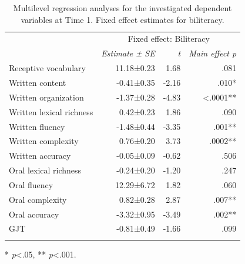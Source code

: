 \documentclass[output=paper,modfonts,nonflat,newtxmath]{langsci/langscibook}
\begin{document}
\begin{table}

	\caption{\label{tab:pfenninger:6} Multilevel regression analyses for the investigated dependent variables at Time 1. Fixed effect estimates for biliteracy.}
	\begin{tabularx}{0.83\textwidth}{l rrr}
		\lsptoprule
		& \multicolumn{3}{c}{ Fixed effect: Biliteracy}\\
		\cmidrule{2-4}
		& \textit{Estimate} \textit{±} \textit{SE} & \textit{t}  & \textit{Main effect p}\\
		\cmidrule{1-4}
		Receptive vocabulary & 11.18±0.23 & 1.68 &.081\\
		Written content & -0.41±0.35 & -2.16 & .010*\\
		Written organization & -1.37±0.28 & -4.83 & <.0001**\\
		Written lexical richness & 0.42±0.23 & 1.86 & .090\\
		Written fluency & -1.48±0.44 & -3.35 & .001**\\
		Written complexity & 0.76±0.20 & 3.73 & .0002**\\
		Written accuracy & -0.05±0.09 & -0.62 & .506\\
		Oral lexical richness & -0.24±0.20 & -1.20 & .247\\
		Oral fluency & 12.29±6.72 & 1.82 & .060\\
		Oral complexity & 0.82±0.28 & 2.87 & .007**\\
		Oral accuracy & -3.32±0.95 & -3.49 & .002**\\
		GJT & -0.81±0.49 &-1.66 & .099\\
		\lspbottomrule
	\end{tabularx}

	* \textit{p}<.05, ** \textit{p}<.001.
\end{table}
\end{document}
